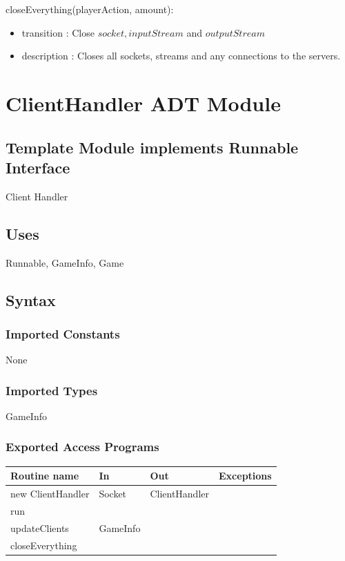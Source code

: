 \documentclass[12pt, titlepage]{article}
\begin{document}
        \noindent closeEverything(playerAction, amount):
        \begin{itemize}
        \item transition : Close $socket, inputStream$ and $outputStream$
        \item description : Closes all sockets,  streams and any connections to the servers.
        \end{itemize}
                
                
        
\section* {ClientHandler ADT Module}
    \subsection* {Template Module implements Runnable Interface}
    Client Handler
    \subsection* {Uses}
    Runnable, GameInfo, Game
    \subsection* {Syntax}
    
        \subsubsection* {Imported Constants}
            None
        \subsubsection* {Imported Types}
            GameInfo
        \subsubsection* {Exported Access Programs}
        
        \begin{tabular}{| l | l | l | p{6cm} |}
            \hline
            \textbf{Routine name} & \textbf{In} & \textbf{Out} & \textbf{Exceptions}\\
            \hline
            new ClientHandler & Socket & ClientHandler & \\
            \hline
            run &  &  & \\
            \hline 
            updateClients & GameInfo &  &\\
            \hline 
            closeEverything & & &\\
            \hline
        \end{tabular}
        
\end{document}
